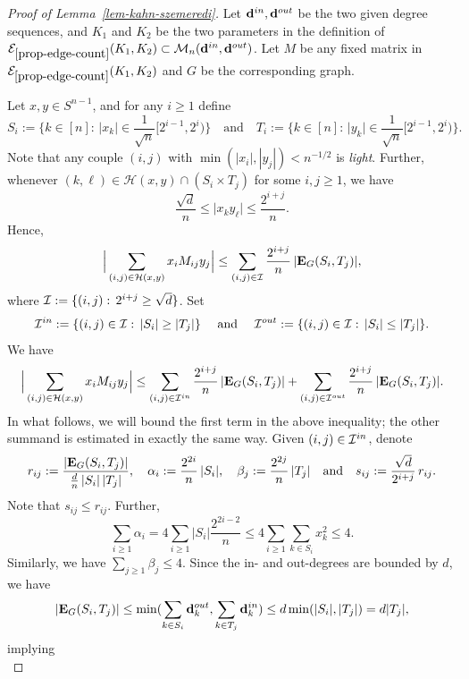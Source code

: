 \documentclass[12pt]{article}
\theoremstyle{definition}
\theoremstyle{plain}
\newcommand{\Event}{\mathcal{E}}
\def\nrangr{G}
\def\edg{{\bf E}_{\nrangr}}
\def\InDeg{{\bf d}^{in}}
\def\OutDeg{{\bf d}^{out}}
\def\InI{{\cal{I}}^{in}}
\def\OutI{{\cal{I}}^{out}}
\def\MatrixSet{{\mathcal M}_n}
\begin{document}
\begin{proof}[Proof of Lemma~\ref{lem-kahn-szemeredi}] 
Let $\InDeg,\OutDeg$ be the two given degree sequences, and $K_1$ and $K_2$ be the two 
parameters in the definition of $\Event_{\ref{prop-edge-count}}(K_1,K_2)\subset\MatrixSet(\InDeg,\OutDeg)$.
Let $M$ be any fixed matrix in $\Event_{\ref{prop-edge-count}}(K_1,K_2)$ and
$\nrangr$ be the corresponding graph.

Let $x,y\in S^{n-1}$, and for any $i\geq 1$ define 
$$
S_i:=\Big\{k\in[n]:\, \vert x_k\vert\in \frac{1}{\sqrt{n}}[2^{i-1},2^i)\Big\}\quad \text{and}\quad 
T_i:=\Big\{k\in[n]:\, \vert y_k\vert\in \frac{1}{\sqrt{n}}[2^{i-1},2^i)\Big\}.
$$
Note that any couple $(i,j)$ with $\min(|x_i|,|y_j|)<n^{-1/2}$ is {\it light}.
Further, whenever $(k,\ell)\in \mathcal{H}(x,y)\cap (S_i\times T_j)$ for some $i,j\geq 1$, we have 
$$
\frac{\sqrt{d}}{n}\leq \vert x_k y_\ell\vert \leq \frac{2^{i+j}}{n}.
$$
Hence, 
$$
\Big\vert\sum_{(i,j)\in \mathcal{H}(x,y)} x_i M_{ij}y_j\Big\vert\leq
\sum_{(i,j)\in \cal{I}} \frac{2^{i+j}}{n}\, \vert\edg(S_i,T_j)\vert,
$$
where ${\cal{I}}:=\{(i,j):\,  2^{i+j}\geq \sqrt{d}\}$. 
Set
$$
\InI:=\{(i,j)\in {\cal{I}}:\, \vert S_i\vert\geq \vert T_j\vert\}\quad \text{ and } \quad\OutI:=\{(i,j)\in {\cal{I}}:\, \vert S_i\vert\leq \vert T_j\vert\}.
$$
We have 
$$
\Big\vert\sum_{(i,j)\in \mathcal{H}(x,y)} x_i M_{ij}y_j\Big\vert\leq 
\sum_{(i,j)\in \InI} \frac{2^{i+j}}{n}\, \vert\edg(S_i,T_j)\vert 
+
\sum_{(i,j)\in \OutI} \frac{2^{i+j}}{n}\, \vert\edg(S_i,T_j)\vert.
$$
In what follows, we will bound the first term in the above inequality; the other summand is estimated in exactly the same way.
Given $(i,j)\in \InI$, 
denote 
$$
r_{ij}:=\frac{\vert \edg(S_i,T_j)\vert}{\frac{d}{n}\, \vert S_i\vert\, \vert T_j\vert},\quad 
\alpha_i:=\frac{2^{2i}}{n}\,\vert S_i\vert, \quad \beta_j:=\frac{2^{2j}}{n}\, \vert T_j\vert 
\quad  \text{and}\quad s_{ij}:=\frac{\sqrt{d}}{2^{i+j}}\, r_{ij}.
$$
Note that $s_{ij}\leq r_{ij}$. Further,
\begin{equation}\label{eq1-lem-kahn-szemeredi}
\sum_{i\geq 1} \alpha_i=4\sum_{i\geq 1}\vert S_i\vert \frac{2^{2i-2}}{n}\leq 4\sum_{i\geq 1} 
\sum_{k\in S_i} x_k^2\leq 4.
\end{equation}
Similarly, we have $\sum_{j\geq 1} \beta_j\leq 4$. 
Since the in- and out-degrees are bounded by $d$, we have 
$$
\vert \edg(S_i,T_j)\vert\leq \min( \sum_{k\in S_i} \OutDeg_k, \sum_{k\in T_j} \InDeg_k)\leq d\min (\vert S_i\vert , \vert T_j\vert)= d\vert T_j\vert,
$$ 
implying
\begin{equation}\label{eq2-lem-kahn-szemeredi}

\end{equation}
\end{proof}
\end{document}
